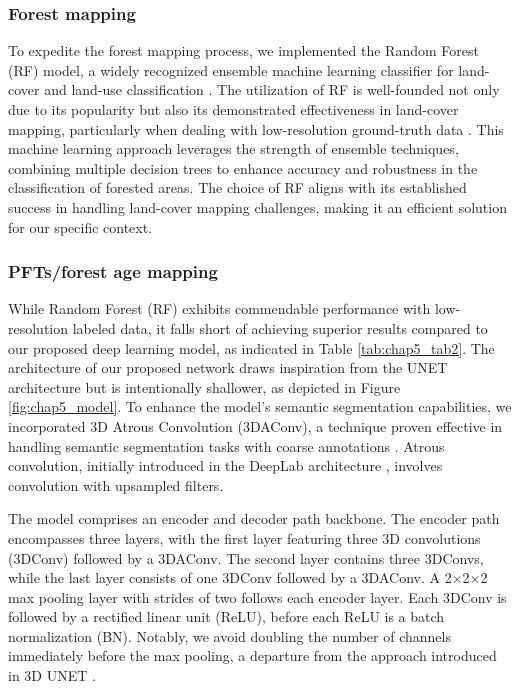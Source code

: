 \subsubsection*{Forest mapping}
To expedite the forest mapping process, we implemented the Random Forest (RF) model, a widely recognized ensemble machine learning classifier for land-cover and land-use classification \citep{gislason2006random}. The utilization of RF is well-founded not only due to its popularity but also its demonstrated effectiveness in land-cover mapping, particularly when dealing with low-resolution ground-truth data \citep{robinson2021global}. This machine learning approach leverages the strength of ensemble techniques, combining multiple decision trees to enhance accuracy and robustness in the classification of forested areas. The choice of RF aligns with its established success in handling land-cover mapping challenges, making it an efficient solution for our specific context. \par
\subsubsection*{PFTs\slash forest age mapping}

While Random Forest (RF) exhibits commendable performance with low-resolution labeled data, it falls short of achieving superior results compared to our proposed deep learning model, as indicated in Table \ref{tab:chap5_tab2}. The architecture of our proposed network draws inspiration from the UNET architecture \citep{ronneberger2015u} but is intentionally shallower, as depicted in Figure \ref{fig:chap5_model}. To enhance the model's semantic segmentation capabilities, we incorporated 3D Atrous Convolution (3DAConv), a technique proven effective in handling semantic segmentation tasks with coarse annotations \citep{chen2017rethinking}. Atrous convolution, initially introduced in the DeepLab architecture \citep{chen2017deeplab}, involves convolution with upsampled filters. \par

The model comprises an encoder and decoder path backbone. The encoder path encompasses three layers, with the first layer featuring three 3D convolutions (3DConv) followed by a 3DAConv. The second layer contains three 3DConvs, while the last layer consists of one 3DConv followed by a 3DAConv. A 2$\times$2$\times$2 max pooling layer with strides of two follows each encoder layer. Each 3DConv is followed by a rectified linear unit (ReLU), before each ReLU is a batch normalization (BN). Notably, we avoid doubling the number of channels immediately before the max pooling, a departure from the approach introduced in 3D UNET \citep{cciccek20163d}. \par

